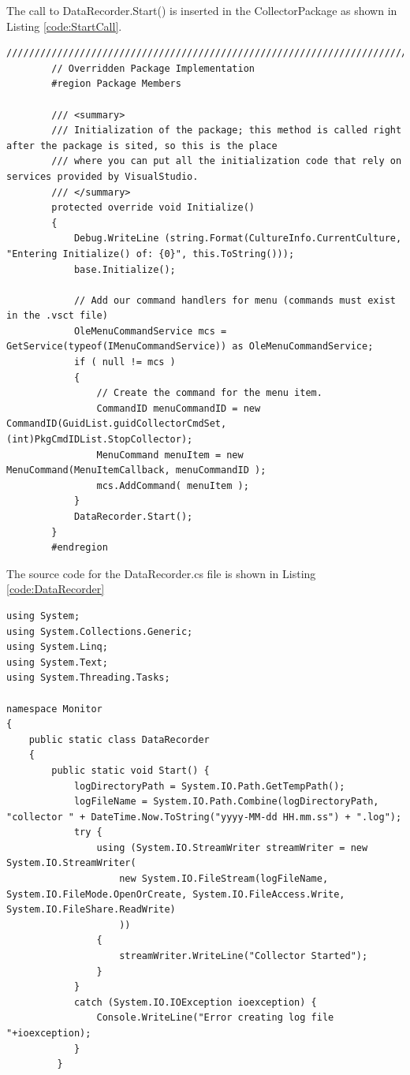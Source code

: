 \begin{Answer}

The call to DataRecorder.Start() is inserted in the CollectorPackage as shown in Listing \ref{code:StartCall}.
\begin{lstlisting}[caption=Call to DataRecorder.Start(),label=code:StartCall,float=h]
        /////////////////////////////////////////////////////////////////////////////
        // Overridden Package Implementation
        #region Package Members

        /// <summary>
        /// Initialization of the package; this method is called right after the package is sited, so this is the place
        /// where you can put all the initialization code that rely on services provided by VisualStudio.
        /// </summary>
        protected override void Initialize()
        {
            Debug.WriteLine (string.Format(CultureInfo.CurrentCulture, "Entering Initialize() of: {0}", this.ToString()));
            base.Initialize();

            // Add our command handlers for menu (commands must exist in the .vsct file)
            OleMenuCommandService mcs = GetService(typeof(IMenuCommandService)) as OleMenuCommandService;
            if ( null != mcs )
            {
                // Create the command for the menu item.
                CommandID menuCommandID = new CommandID(GuidList.guidCollectorCmdSet, (int)PkgCmdIDList.StopCollector);
                MenuCommand menuItem = new MenuCommand(MenuItemCallback, menuCommandID );
                mcs.AddCommand( menuItem );
            }
            DataRecorder.Start();
        }
        #endregion
\end{lstlisting}

The source code for the DataRecorder.cs file is shown in Listing \ref{code:DataRecorder}
\begin{lstlisting}[caption=Data Recorder Class,
  label=code:DataRecorder,
  float=h]
using System;
using System.Collections.Generic;
using System.Linq;
using System.Text;
using System.Threading.Tasks;

namespace Monitor
{
    public static class DataRecorder
    {
        public static void Start() {
            logDirectoryPath = System.IO.Path.GetTempPath();
            logFileName = System.IO.Path.Combine(logDirectoryPath, "collector " + DateTime.Now.ToString("yyyy-MM-dd HH.mm.ss") + ".log");
            try {
                using (System.IO.StreamWriter streamWriter = new System.IO.StreamWriter(
                    new System.IO.FileStream(logFileName, System.IO.FileMode.OpenOrCreate, System.IO.FileAccess.Write, System.IO.FileShare.ReadWrite)
                    ))
                {
                    streamWriter.WriteLine("Collector Started");
                }
            } 
            catch (System.IO.IOException ioexception) {
                Console.WriteLine("Error creating log file "+ioexception);
            }
         }


\end{lstlisting}
\end{Answer}
